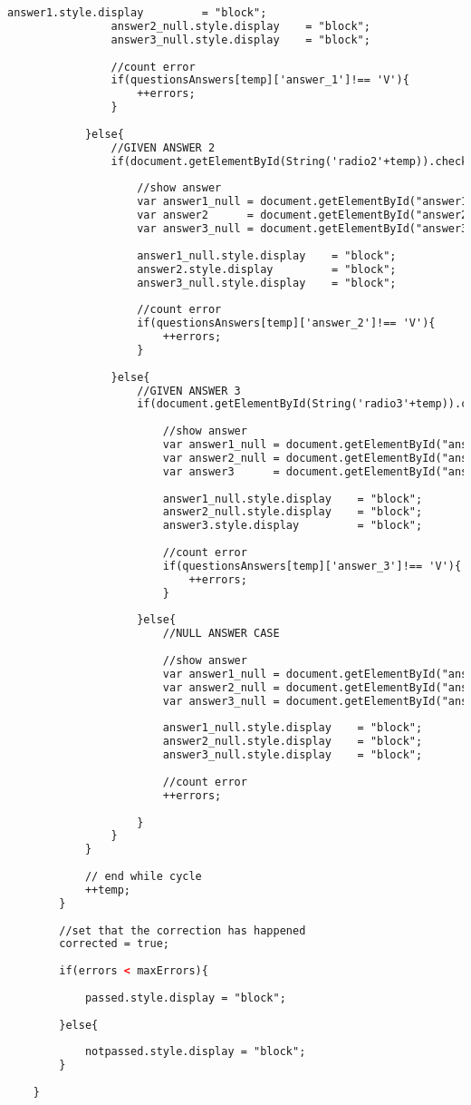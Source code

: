 \begin{lstlisting}[language=html]
				answer1.style.display         = "block";
				answer2_null.style.display    = "block";
				answer3_null.style.display    = "block";
				
				//count error
				if(questionsAnswers[temp]['answer_1']!== 'V'){
					++errors;
				}
				
			}else{
				//GIVEN ANSWER 2
				if(document.getElementById(String('radio2'+temp)).checked){
					
					//show answer
					var answer1_null = document.getElementById("answer1_null"+temp);
					var answer2      = document.getElementById("answer2"+temp);
					var answer3_null = document.getElementById("answer3_null"+temp);
					
					answer1_null.style.display    = "block";
					answer2.style.display         = "block";
					answer3_null.style.display    = "block";
					
					//count error
					if(questionsAnswers[temp]['answer_2']!== 'V'){
						++errors;
					}
					
				}else{
					//GIVEN ANSWER 3
					if(document.getElementById(String('radio3'+temp)).checked){
						
						//show answer
						var answer1_null = document.getElementById("answer1_null"+temp);
						var answer2_null = document.getElementById("answer2_null"+temp);
						var answer3      = document.getElementById("answer3"+temp);
						
						answer1_null.style.display    = "block";
						answer2_null.style.display    = "block";
						answer3.style.display         = "block";
						
						//count error
						if(questionsAnswers[temp]['answer_3']!== 'V'){
							++errors;
						}
						
					}else{
						//NULL ANSWER CASE
						
						//show answer
						var answer1_null = document.getElementById("answer1_null"+temp);
						var answer2_null = document.getElementById("answer2_null"+temp);
						var answer3_null = document.getElementById("answer3_null"+temp);
						
						answer1_null.style.display    = "block";
						answer2_null.style.display    = "block";
						answer3_null.style.display    = "block";
						
						//count error
						++errors;
						
					}
				}
			}
			
			// end while cycle
			++temp;
		}
		
		//set that the correction has happened
		corrected = true;
		
		if(errors < maxErrors){
			
			passed.style.display = "block";
			
		}else{
			
			notpassed.style.display = "block";
		}
		
	}
\end{lstlisting}
